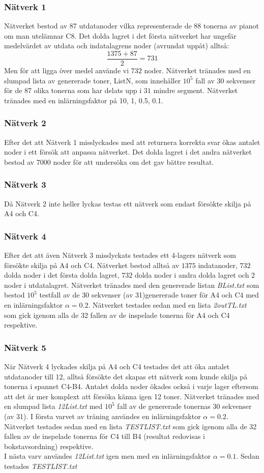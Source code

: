 \documentclass[a4paper,10pt]{article}
\begin{document}
\subsubsection{Nätverk 1}
Nätverket bestod av 87 utdatanoder vilka representerade de 88 tonerna av pianot om man utelämnar C8. 
Det dolda lagret i det första nätverket har ungefär medelvärdet av utdata och indatalagrens noder (avrundat uppåt) alltså: \[\dfrac{1375+87}{2}=731\] Men för att ligga över medel använde vi $732$ noder. Nätverket tränades med en slumpad lista av genererade toner, ListN, som innehåller $10^5$ fall av 30 sekvenser för de 87 olika tonerna som har delats upp i $31$ mindre segment. Nätverket tränades med en inlärningsfaktor på 10, 1, 0.5, 0.1. 
\subsubsection{Nätverk 2}
Efter det att Nätverk 1 misslyckades med att returnera korrekta svar ökas antalet noder i ett försök att anpassa nätverket. Det dolda lagret i det andra nätverket bestod av 7000 noder för att undersöka om det gav bättre resultat. 
\subsubsection{Nätverk 3}
Då Nätverk 2 inte heller lyckas testas ett nätverk som endast försökte skilja på A4 och C4. 
\subsubsection{Nätverk 4}
Efter det att även Nätverk 3 misslyckats testades ett 4-lagers nätverk som försökte skilja på A4 och C4. Nätverket bestod alltså av $1375$ indatanoder, $732$ dolda noder i det första dolda lagret, $732$ dolda noder i andra dolda lagret och 2 noder i utdatalagret. Nätverket tränades med den genererade listan \emph{BList.txt} som bestod $10^5$ testfall av de 30 sekvenser (av 31)genererade toner för A4 och C4 med en inlärningsfaktor $\alpha=0.2$. Nätverket testades sedan med en lista \emph{2outTL.txt} som gick igenom alla de 32 fallen av de inspelade tonerna för A4 och C4 respektive.
\subsubsection{Nätverk 5}
När Nätverk 4 lyckades skilja på A4 och C4 testades det att öka antalet utdatanoder till 12, alltså försökte det skapas ett nätverk som kunde skilja på tonerna i spannet C4-B4. Antalet dolda noder ökades också i varje lager eftersom att det är mer komplext att försöka känna igen 12 toner. Nätverket tränades med en slumpad lista \emph{12List.txt} med $10^5$ fall av de genererade tonernas 30 sekvenser (av 31). I första varvet av träning användes en inlärningsfaktor $\alpha=0.2$. Nätverket testades sedan med en lista \emph{TESTLIST.txt} som gick igenom alla de 32 fallen av de inspelade tonerna för C4 till B4 (resultat redovisas i bokstavsordning) respektive. \\I nästa varv användes \emph{12List.txt} igen men med en inlärningsfaktor $\alpha=0.1$. Sedan testades \emph{TESTLIST.txt}
\end{document}
